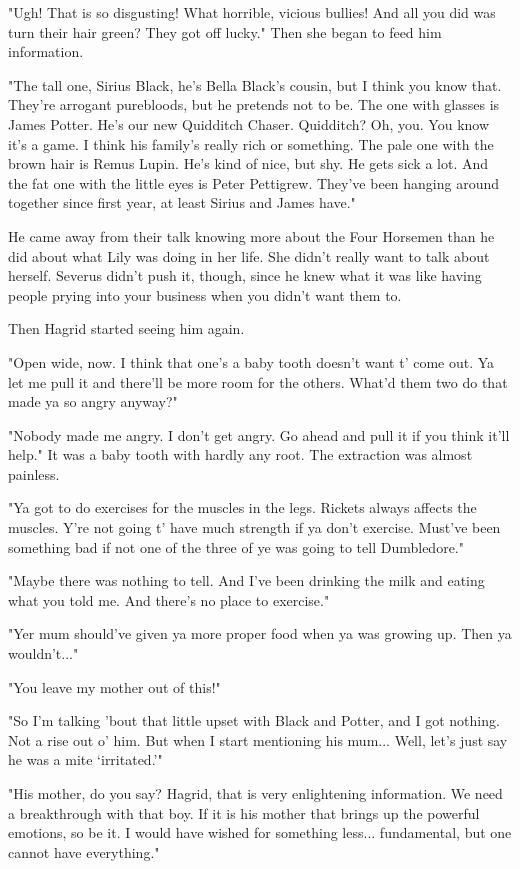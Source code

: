\documentclass[a4paper,11pt]{article}
\begin{document}
"Ugh! That is so disgusting! What horrible, vicious bullies! And all you did was turn their hair green? They got off lucky." Then she began to feed him information.

"The tall one, Sirius Black, he's Bella Black's cousin, but I think you know that. They're arrogant purebloods, but he pretends not to be. The one with glasses is James Potter. He's our new Quidditch Chaser. Quidditch? Oh, you. You know it's a game. I think his family's really rich or something. The pale one with the brown hair is Remus Lupin. He's kind of nice, but shy. He gets sick a lot. And the fat one with the little eyes is Peter Pettigrew. They've been hanging around together since first year, at least Sirius and James have."

He came away from their talk knowing more about the Four Horsemen than he did about what Lily was doing in her life. She didn't really want to talk about herself. Severus didn't push it, though, since he knew what it was like having people prying into your business when you didn't want them to.

Then Hagrid started seeing him again.

"Open wide, now. I think that one's a baby tooth doesn't want t' come out. Ya let me pull it and there'll be more room for the others. What'd them two do that made ya so angry anyway?"

"Nobody made me angry. I don't get angry. Go ahead and pull it if you think it'll help." It was a baby tooth with hardly any root. The extraction was almost painless.

"Ya got to do exercises for the muscles in the legs. Rickets always affects the muscles. Y're not going t' have much strength if ya don't exercise. Must've been something bad if not one of the three of ye was going to tell Dumbledore."

"Maybe there was nothing to tell. And I've been drinking the milk and eating what you told me. And there's no place to exercise."

"Yer mum should've given ya more proper food when ya was growing up. Then ya wouldn't..."

"You leave my mother out of this!"

"So I'm talking 'bout that little upset with Black and Potter, and I got nothing. Not a rise out o' him. But when I start mentioning his mum... Well, let's just say he was a mite `irritated.'"

"His mother, do you say? Hagrid, that is very enlightening information. We need a breakthrough with that boy. If it is his mother that brings up the powerful emotions, so be it. I would have wished for something less... fundamental, but one cannot have everything."
\end{document}
